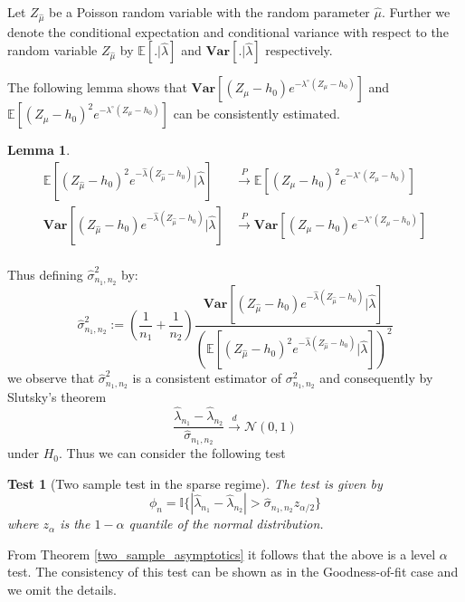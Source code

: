 \documentclass[12pt]{article}
\numberwithin{equation}{section}
\newtheorem{lemma}{Lemma}[section]
\newtheorem{test}{Test}[section]
\begin{document}
Let $Z_{\hat{\mu}}$ be a Poisson random variable with the random parameter $\hat{\mu}$. Further we denote the conditional expectation and conditional variance with respect to the random variable $Z_{\hat{\mu}}$ by  $\mathbb{E}\left[.\vert \hat{\lambda}\right]$ and $\mathbf{Var}\left[.\vert \hat{\lambda}\right]$ respectively.

The following lemma shows that $\mathbf{Var}\left[(Z_{\mu}-h_0)e^{-\lambda^{\circ}(Z_{\mu}-h_0)}\right]$ and $\mathbb{E}\left[(Z_{\mu}-h_0)^2e^{-\lambda^{\circ}(Z_{\mu}-h_0)}\right]$ can be consistently estimated.

\begin{lemma}{\label{lambda_cont}}
   \begin{align*}
   \mathbb{E}\left[(Z_{\hat{\mu}}-h_0)^2e^{-\hat{\lambda}(Z_{\hat{\mu}}-h_0)}\vert \hat{\lambda}\right]&\xrightarrow{P} \mathbb{E}\left[(Z_{\mu}-h_0)^2e^{-\lambda^{\circ}(Z_{\mu}-h_0)}\right]\\
       \mathbf{Var}\left[(Z_{\hat{\mu}}-h_0)e^{-\hat{\lambda}(Z_{\hat{\mu}}-h_0)}\vert \hat{\lambda}\right]&\xrightarrow{P}\mathbf{Var}\left[(Z_{\mu}-h_0)e^{-\lambda^{\circ}(Z_{\mu}-h_0)}\right]\\
   \end{align*} 
\end{lemma}

Thus defining $\hat{\sigma}^2_{n_1,n_2}$ by:
$$\hat{\sigma}^2_{n_1,n_2}:=\left(\frac{1}{n_1}+\frac{1}{n_2}\right)\frac{\mathbf{Var}\left[(Z_{\hat{\mu}}-h_0)e^{-\hat{\lambda}(Z_{\hat{\mu}}-h_0)}\vert \hat{\lambda}\right]}{\left(\mathbb{E}\left[(Z_{\hat{\mu}}-h_0)^2e^{-\hat{\lambda}(Z_{\hat{\mu}}-h_0)}\vert \hat{\lambda}\right]\right)^2}$$
 we observe that $\hat{\sigma}^2_{n_1,n_2}$ is a consistent estimator of $\sigma^2_{n_1,n_2}$ and consequently by Slutsky's theorem
\[\frac{\hat{\lambda}_{n_1} - \hat{\lambda}_{n_2}}{\hat{\sigma}_{n_1,n_2}}\xrightarrow{d} \mathcal{N}(0,1)\]
under $H_0$. Thus we can consider the following test

\begin{test}[Two sample test in the sparse regime]{\label{two_samp_sparse}}The test is given by
 \[\phi_{n}=\mathbb{I}\{|\hat{\lambda}_{n_1}-\hat{\lambda}_{n_2}|>\hat{\sigma}_{n_1,n_2}z_{\alpha/2}\}\]
where $z_{\alpha}$ is the $1-\alpha$ quantile of the normal distribution.   
\end{test}
 From Theorem \ref{two_sample_asymptotics} it follows that the above is a level $\alpha$ test. The consistency of this test can be shown as in the Goodness-of-fit case and we omit the details.
\end{document}
